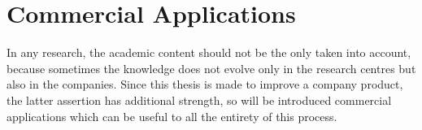 \section{Commercial Applications}
\label{sec:commercial_applications}
In any research, the academic content should not be the only taken into 
account, because sometimes the knowledge does not evolve only in the research 
centres but also in the companies. Since this thesis is made to improve a 
company product, the latter assertion has additional strength, so will be 
introduced commercial applications which can be useful to all the entirety of 
this process.